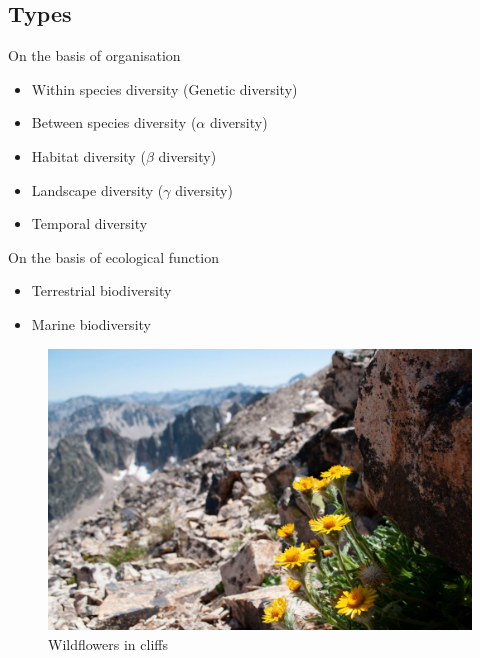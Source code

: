 \documentclass[ignorenonframetext,aspectratio=169]{beamer}
\providecommand{\tightlist}{%
  \setlength{\itemsep}{0pt}\setlength{\parskip}{0pt}}
\begin{document}
\hypertarget{types}{%
\subsection{Types}\label{types}}

\begin{frame}{On the basis of organisation}
\protect\hypertarget{on-the-basis-of-organisation}{}

\begin{itemize}
\tightlist
\item
  Within species diversity (Genetic diversity)
\item
  Between species diversity (\(\alpha\) diversity)
\item
  Habitat diversity (\(\beta\) diversity)
\item
  Landscape diversity (\(\gamma\) diversity)
\item
  Temporal diversity
\end{itemize}

\end{frame}

\begin{frame}{On the basis of ecological function}
\protect\hypertarget{on-the-basis-of-ecological-function}{}

\begin{itemize}
\tightlist
\item
  Terrestrial biodiversity
\item
  Marine biodiversity
\end{itemize}

\end{frame}

\begin{frame}{}
\protect\hypertarget{section-5}{}

\begin{figure}
\includegraphics[width=0.7\linewidth]{./../images/twttr/wildflower_cliff_D_OOw-NXoAEuyIO} \caption{Wildflowers in cliffs}\label{fig:landscape-diversity}
\end{figure}

\end{frame}
\end{document}
